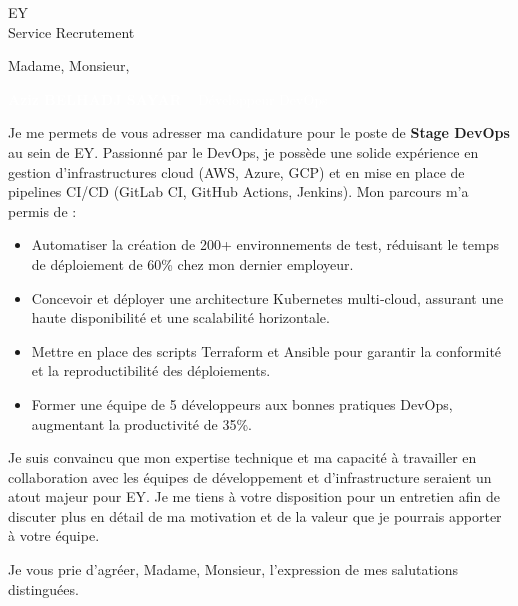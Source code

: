 \documentclass[11pt,a4paper]{letter}
\newcommand{\CandidateName}{Aziz BELHADJ SAYAR}
\newcommand{\CandidateTitle}{Développeur DevOps}
\newcommand{\CompanyName}{EY}
\newcommand{\Position}{Stage DevOps}
\begin{document}
\begin{letter}{\CompanyName\\ Service Recrutement}
\opening{Madame, Monsieur,}
\vspace{-1cm}
\noindent\colorbox{headercolor}{\parbox{\dimexpr\linewidth-2\fboxsep}{\textcolor{white}{\Large \textbf{\CandidateName} – \CandidateTitle}}}
\vspace{1cm}
\noindent
Je me permets de vous adresser ma candidature pour le poste de \textbf{\Position} au sein de \textcolor{companycolor}{\CompanyName}. Passionné par le DevOps, je possède une solide expérience en gestion d’infrastructures cloud (AWS, Azure, GCP) et en mise en place de pipelines CI/CD (GitLab CI, GitHub Actions, Jenkins).  
Mon parcours m’a permis de :
\begin{itemize}[leftmargin=*,labelsep=1em]
    \item Automatiser la création de 200+ environnements de test, réduisant le temps de déploiement de 60\% chez mon dernier employeur.
    \item Concevoir et déployer une architecture Kubernetes multi‑cloud, assurant une haute disponibilité et une scalabilité horizontale.
    \item Mettre en place des scripts Terraform et Ansible pour garantir la conformité et la reproductibilité des déploiements.
    \item Former une équipe de 5 développeurs aux bonnes pratiques DevOps, augmentant la productivité de 35\%.
\end{itemize}
Je suis convaincu que mon expertise technique et ma capacité à travailler en collaboration avec les équipes de développement et d’infrastructure seraient un atout majeur pour \textcolor{companycolor}{\CompanyName}.  
Je me tiens à votre disposition pour un entretien afin de discuter plus en détail de ma motivation et de la valeur que je pourrais apporter à votre équipe.
\closing{Je vous prie d’agréer, Madame, Monsieur, l’expression de mes salutations distinguées.}
\vspace{1cm}
\signature{\CandidateName\\\href{mailto:aziz.belhadj@example.com}{aziz.belhadj@example.com} – \href{tel:+33123456789}{+33 1 23 45 67 89}\\\href{https://www.linkedin.com/in/azizbelhadj}{LinkedIn} – \href{https://github.com/azizbelhadj}{GitHub}}
\end{letter}
\end{document}
